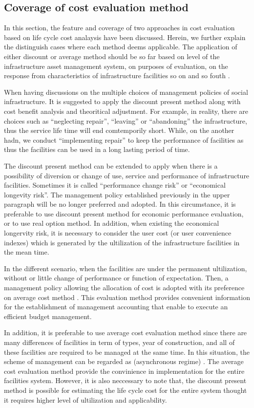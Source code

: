 \subsection{Coverage of cost evaluation method}
\label{634}
In this section, the feature and coverage of two approaches in cost evaluation based on life cycle cost analaysis have been discussed. Herein, we further explain the distinguish cases where each method deems applicable. The application of either discount or average method should be so far based on level of the infrastructure asset management system, on purposes of evaluation, on the response from characteristics of infrastructure facilities so on and so fouth \cite{koba}.

When having discussions on the multiple choices of management policies of social infrastructure. It is suggested to apply the discount present method along with cost benefit analysis and theoritical adjustment. For example, in reality, there are choices such as ``neglecting repair'', ``leaving'' or ``abandoning'' the infrastructure, thus the service life time will end comtemporily short. While, on the another hadn, we conduct ``implementing repair'' to keep the performance of facilities as thus the facilities can be used in a long lasting period of time.

The discount present method can be extended to apply when there is a possibility of diversion or change of use, service and performance of infrastructure facilities. Sometimes it is called ``performance change risk'' or ``economical longevity risk''. The management policy established previously in the upper paragraph will be no longer preferred and adopted. In this circumstance, it is preferable to use discount present method for economic performance evaluation, or to use real option method. In addition, when existing the economical longervity risk, it is necessary to consider the user cost (or user convenience indexes) which is generated by the ultilization of the infrastructure facilities in the mean time.

In the different scenario, when the facilities are under the permanent ultilization, without or little change of performance or function of expectation. Then, a management policy allowing the allocation of cost is adopted with its preference on average cost method \cite{ejiri}. This evaluation method provides convenient information for the establishment of management accounting that enable to execute an efficient budget management.

In addition, it is preferable to use average cost evaluation method since there are many differences of facilities in term of types, year of construction, and all of these facilities are required to be managed at the same time. In this situation, the scheme of management can be regarded as (asynchronous regime) \cite{kobaevarg}. The average cost evaluation method provide the convinience in implementation for the entire facilities system. However, it is also neccessary to note that, the discount present method is possible for estimating the life cycle cost for the entire system thought it requires higher level of ultilization and applicability.
